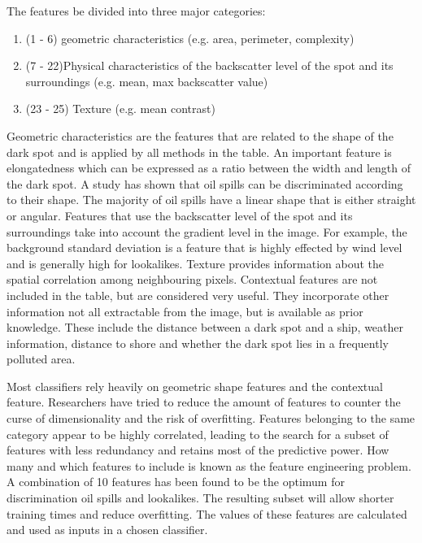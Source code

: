 The features be divided into three major categories\cite{Brekke200595}:
\begin{enumerate}
\item (1 - 6) geometric characteristics (e.g. area, perimeter, complexity)
\item (7 - 22)Physical characteristics of the backscatter level of the spot and its surroundings (e.g. mean, max backscatter value)
\item (23 - 25) Texture (e.g. mean contrast)
\end{enumerate}

Geometric characteristics are the features that are related to the shape of the dark spot and is applied by all methods in the table\cite{Topouzelis200930}. An important feature is elongatedness which can be expressed as a ratio between the width and length of the dark spot\cite{Gasull20071}. A study has shown that oil spills can be discriminated according to their shape\cite{Guo2014146}. The majority of oil spills have a linear shape that is either straight or angular\cite{Pavlakis200156}. Features that use the backscatter level of the spot and its surroundings take into account the gradient level in the image. For example, the background standard deviation is a feature that is highly effected by wind level and is generally high for lookalikes. Texture provides information about the spatial correlation among neighbouring pixels. Contextual features are not included in the table, but are considered very useful\cite{Topouzelis200930}. They incorporate other information not all extractable from the image, but is available as prior knowledge. These include the distance between a dark spot and a ship, weather information, distance to shore and whether the dark spot lies in a frequently polluted area.

Most classifiers rely heavily on geometric shape features and the contextual feature.\cite{Xu201414} Researchers have tried to reduce the amount of features to counter the curse of dimensionality and the risk of overfitting. Features belonging to the same category appear to be highly correlated\cite{Xu201414}, leading to the search for a subset of features with less redundancy and retains most of the predictive power. How many and which features to include is known as the feature engineering problem. A combination of 10 features has been found to be the optimum for discrimination oil spills and lookalikes\cite{Topouzelis200930}. The resulting subset will allow shorter training times and reduce overfitting. The values of these features are calculated and used as inputs in a chosen classifier.
